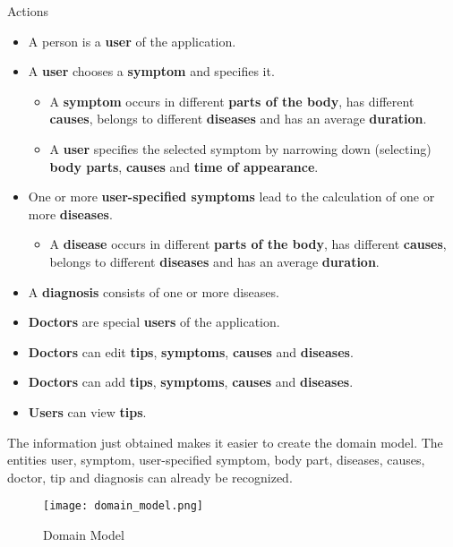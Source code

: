 Actions
\begin{itemize}
	\item A person is a \textbf{user} of the application.
	\item A \textbf{user} chooses a \textbf{symptom} and specifies it.
	\begin{itemize}
		\item A \textbf{symptom} occurs in different \textbf{parts of the body}, has different \textbf{causes}, belongs to different \textbf{diseases} and has an average \textbf{duration}.
		\item A \textbf{user} specifies the selected symptom by narrowing down (selecting) \textbf{body parts}, \textbf{causes} and \textbf{time of appearance}.
	\end{itemize}
	\item One or more \textbf{user-specified symptoms} lead to the calculation of one or more \textbf{diseases}.
	\begin{itemize}
		\item A \textbf{disease} occurs in different \textbf{parts of the body}, has different \textbf{causes}, belongs to different \textbf{diseases} and has an average \textbf{duration}.
	\end{itemize}
	\item A \textbf{diagnosis} consists of one or more diseases.
	\item \textbf{Doctors} are special \textbf{users} of the application.
	\item \textbf{Doctors} can edit \textbf{tips}, \textbf{symptoms}, \textbf{causes} and \textbf{diseases}.
	\item \textbf{Doctors} can add \textbf{tips}, \textbf{symptoms}, \textbf{causes} and \textbf{diseases}.
	\item \textbf{Users} can view \textbf{tips}.  
\end{itemize}

The information just obtained makes it easier to create the domain model. The entities user, symptom, user-specified symptom, body part, diseases, causes, doctor, tip and diagnosis can already be recognized.
\begin{figure}[h]
	\centering
	\texttt{[image: domain\_model.png]}
	\caption[Domain Model]{Domain Model}
\end{figure}


